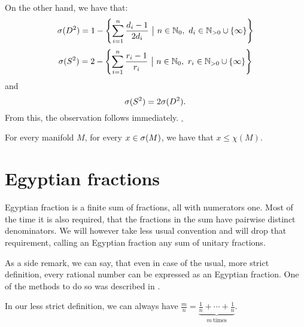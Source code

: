 On the other hand, we have that:
\begin{equation}
\speD = 1-\left\{\sum\limits_{i=1}^n\frac{d_i-1}{2d_i}\ 
\big|\ n\in\mathbb{N}_0,\ d_i\in\mathbb{N}_{>0}\cup \{\infty\}\right\}
\end{equation}
\begin{equation}
\speS = 2 - \left\{\sum\limits_{i=1}^n \frac{r_i-1}{r_i}\ \big|\ n\in\mathbb{N}_0,\ 
r_i\in\mathbb{N}_{>0}\cup \{\infty\}\right\}
\end{equation}
and
\begin{equation}
{{\sigma}(S^2)} = 2{{\sigma}(D^2)}.
\end{equation}
From this, the observation follows immediately. $_\square$

\begin{observation}\label{spectrum lesser than chi}
For every manifold $M$, for every $x \in {{\sigma}(M)}$, we have that $x \leq \chi(M)$.
\end{observation}


\section{Egyptian fractions}
Egyptian fraction is a finite sum of fractions, all with numerators one. 
Most of the time it is also required, that the fractions in the sum have pairwise distinct 
denominators. We will however take less usual convention and will drop that requirement, 
calling an Egyptian fraction any sum of unitary fractions. 

As a side remark, we can say, that even in case of the usual, more strict definition, 
every rational number can be expressed as an Egyptian fraction. One of the methods 
to do so was described in \cite{Engel1913}.

In our less strict definition, we can always have 
$\frac{m}{n} = \underbrace{\frac{1}{n}+\cdots+\frac{1}{n}}_{m\ \mathrm{times}}$.
